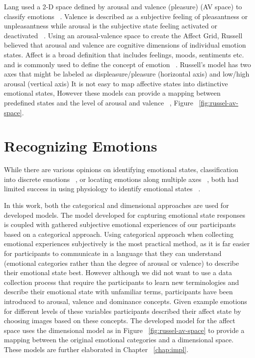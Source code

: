 \documentclass{uofsthesis-cs}
\begin{document}
Lang used a 2-D space defined by arousal and valence (pleasure) (AV space) to classify emotions ~\cite{lang1995emotion}. Valence is described as a subjective feeling of pleasantness or unpleasantness while arousal is the subjective state feeling activated or deactivated ~\cite{barrett1998discrete}. Using an arousal-valence space to create the Affect Grid, Russell believed that arousal and valence are cognitive dimensions of individual emotion states. Affect is a broad definition that includes feelings, moods, sentiments etc. and is commonly used to define the concept of emotion ~\cite{picard2003affective}. Russell's model has two axes that might be labeled as displeasure/pleasure (horizontal axis) and low/high arousal (vertical axis) It is not easy to map affective states into distinctive emotional states, However these models can provide a mapping between predefined states and the level of arousal and valence ~\cite{zagalo2004story}, Figure ~\ref{fig:russel-av-space}.

\section{Recognizing Emotions}

While there are various opinions on identifying emotional states, classification into discrete emotions ~\cite{dalgleish1999handbook}, or locating emotions along multiple axes ~\cite{russell1989affect, lang1995emotion}, both had limited success in using physiology to identify emotional states ~\cite{cacioppo2000psychophysiology}.

In this work, both the categorical and dimensional approaches are used for developed models. The model developed for capturing emotional state responses is coupled with gathered subjective emotional experiences of our participants based on a categorical approach. Using categorical approach when collecting emotional experiences subjectively is the most practical method, as it is far easier for participants to communicate in a language that they can understand (emotional categories rather than the degree of arousal or valence) to describe their emotional state best. However although we did not want to use a data collection process that require the participants to learn new terminologies and describe their emotional state with unfamiliar terms, participants have been introduced to arousal, valence and dominance concepts. Given example emotions for different levels of these variables participants described their affect state by choosing images based on these concepts. The developed model for the affect space uses the dimensional model as in Figure ~\ref{fig:russel-av-space} to provide a mapping between the original emotional categories and a dimensional space. These models are further elaborated in Chapter ~\ref{chap:impl}.
\end{document}
